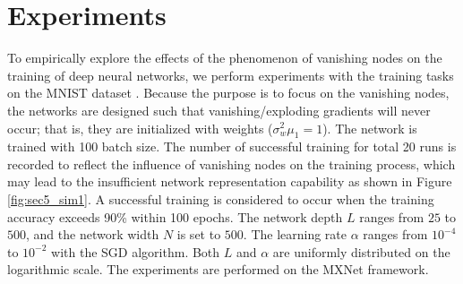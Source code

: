 \chapter{Experiments} \label{experiments}


To empirically explore the effects of the phenomenon of vanishing nodes on the training of deep neural networks, we perform experiments with the training tasks on the MNIST dataset \cite{mnist}. Because the purpose is to focus on the  vanishing nodes, the networks are designed such that vanishing/exploding gradients will never occur; that is, they are initialized with weights ($\sigma_w^2\mu_1=1$).
The network is trained with 100 batch size.
The number of successful training for total 20 runs is recorded to reflect the influence of vanishing nodes on the training process, which may lead to the insufficient network representation capability  as shown in Figure \ref{fig:sec5_sim1}.
A successful training is considered to occur when the training accuracy exceeds 90\% within 100 epochs. 
The network depth $L$ ranges from $25$ to $500$, and the network width $N$ is set to $500$.
The learning rate $\alpha$ ranges from $10^{-4}$ to $10^{-2}$ with the SGD algorithm.
Both $L$ and $\alpha$ are uniformly distributed on the logarithmic scale.
The experiments are performed on the MXNet framework\cite{mxnet}.


